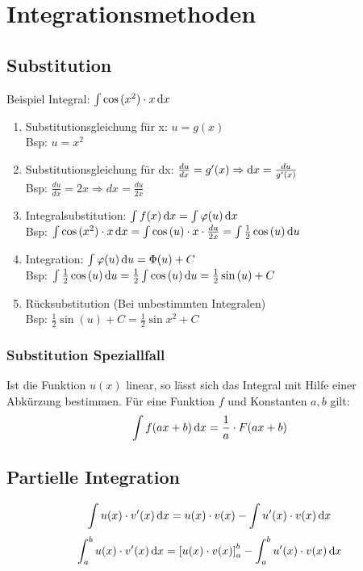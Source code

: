 \section{Integrationsmethoden}
\subsection{Substitution}
Beispiel Integral: $\int \cos{(x^2)} \cdot x \mathop{}\!\mathrm{d} x$
\begin{enumerate}
  \item Substitutionsgleichung für x: $u=g(x)$ \\
    Bsp: $u = x^2$
  \item Substitutionsgleichung für dx: $\frac{du}{dx}=g'(x) \Rightarrow \mathop{}\!\mathrm{d} x = \frac{du}{g'(x)}$ \\
    Bsp: $\frac{du}{dx}=2x \Rightarrow dx = \frac{du}{2x}$
  \item Integralsubstitution: $\int f(x) \mathop{}\!\mathrm{d} x = \int \varphi (u)  \mathop{}\!\mathrm{d} x$ \\
    Bsp: $\int \cos{(x^2)} \cdot x  \mathop{}\!\mathrm{d} x = \int \cos{(u)} \cdot x \cdot \frac{du}{2x} = \int \frac{1}{2} \cos{(u)} \mathop{}\!\mathrm{d} u$
  \item Integration: $\int \varphi(u) \mathop{}\!\mathrm{d} u = \Phi(u) + C$ \\
    Bsp: $\int \frac{1}{2} \cos{(u)} \mathop{}\!\mathrm{d} u = \frac{1}{2} \int \cos{(u)} \mathop{}\!\mathrm{d} u = \frac{1}{2} \sin{(u)} + C$
  \item Rücksubstitution (Bei unbestimmten Integralen) \\
    Bsp: $\frac{1}{2} \sin(u) + C = \frac{1}{2} \sin{x^2} + C$
\end{enumerate}

\subsubsection{Substitution Speziallfall}%
\label{ssub:Substitution Speziallfall}
Ist die Funktion $u(x)$ linear, so lässt sich das Integral mit Hilfe einer Abkürzung bestimmen. Für eine Funktion $f$ und Konstanten $a, b$ gilt:
\begin{equation*}
  \int f(ax + b) \mathop{}\!\mathrm{d} x = \frac{1}{a} \cdot F(ax + b)
\end{equation*}

\subsection{Partielle Integration}
\begin{equation*}
  \int u(x) \cdot v'(x) \mathop{}\!\mathrm{d} x = u(x) \cdot v(x) - \int u'(x) \cdot v(x) \mathop{}\!\mathrm{d} x
\end{equation*}
\begin{equation*}
  \int_{a}^{b} u(x) \cdot v'(x) \mathop{}\!\mathrm{d} x = \left[ u(x) \cdot v(x) \right]^b_a - \int_{a}^{b} u'(x) \cdot v(x) \mathop{}\!\mathrm{d} x
\end{equation*}

